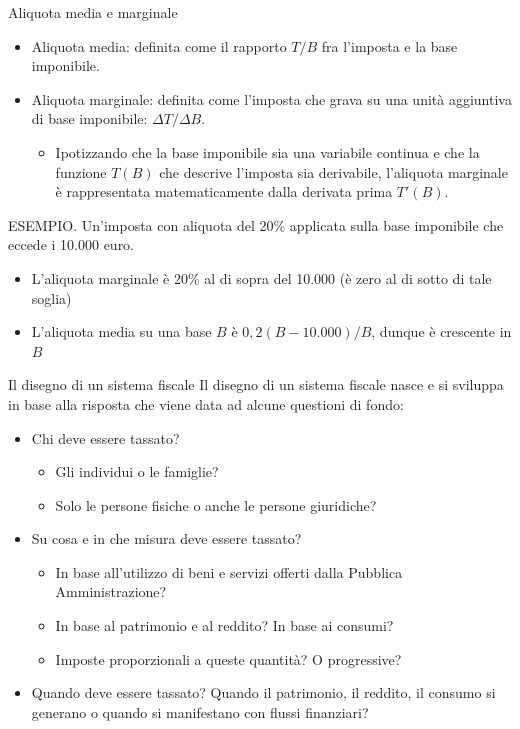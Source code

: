 \documentclass[aspectratio=64,11pt]{beamer}
\begin{document}
\begin{frame}{Aliquota media e marginale}
\begin{itemize}
\item \alert{Aliquota media:} definita come il rapporto $T/B$ fra l'imposta e la base imponibile.
\item \alert{Aliquota marginale:} definita come l'imposta che grava su una unità aggiuntiva di base imponibile: $\Delta T/\Delta B$.
\begin{itemize}
\item Ipotizzando che la base imponibile sia una variabile continua e che la
funzione $T(B)$ che descrive l'imposta sia derivabile, l'aliquota
marginale è rappresentata matematicamente dalla derivata prima $T'(B)$.
\end{itemize}
\end{itemize}

\begin{block}{}
\footnotesize
\alert{ESEMPIO}. Un'imposta con aliquota del 20\% applicata sulla base imponibile che eccede i 10.000 euro.
\begin{itemize}
\item L'aliquota marginale è 20\% al di sopra del 10.000 (è zero al di sotto di tale soglia)
\item L'aliquota media su una base $B$ è $0,2(B-10.000)/B$, dunque è crescente in $B$
\end{itemize}
\end{block}
\end{frame}


\begin{frame}{Il disegno di un sistema fiscale}
Il disegno di un sistema fiscale nasce e si sviluppa in base alla
risposta che viene data ad alcune questioni di fondo:
\begin{itemize}
\item \alert{Chi} deve essere tassato?
\begin{itemize}
\item Gli individui o le famiglie?
\item Solo le persone fisiche o anche le persone giuridiche?
\end{itemize}
\item \alert{Su cosa} e \alert{in che misura} deve essere tassato?\\[0pt]
\begin{itemize}
\item In base all'utilizzo di beni e servizi offerti dalla Pubblica Amministrazione?
\item In base al patrimonio e al reddito? In base ai consumi?
\item Imposte proporzionali a queste quantità? O progressive?
\end{itemize}
\item \alert{Quando} deve essere tassato?  Quando il patrimonio, il reddito, il consumo
si generano o quando si manifestano con flussi finanziari?
\end{itemize}
\end{frame}
\end{document}
